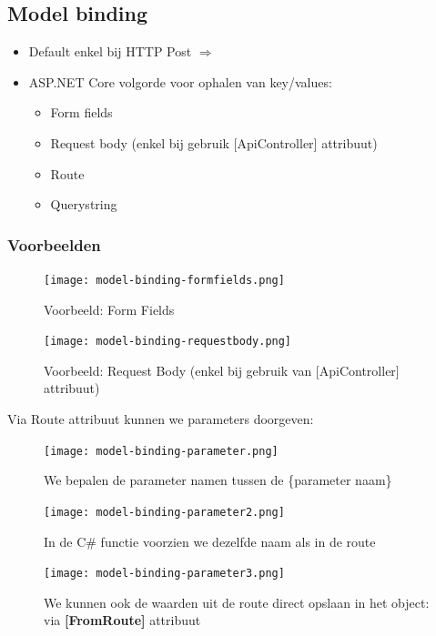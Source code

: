 \documentclass{article}
\begin{document}
\subsection{Model binding}

\begin{itemize}
    \item Default enkel bij HTTP Post $\Rightarrow$
    \item ASP.NET Core volgorde voor ophalen van key/values:
    \begin{itemize}
        \item Form fields
        \item Request body (enkel bij gebruik [ApiController] attribuut)
        \item Route
        \item Querystring
    \end{itemize}
\end{itemize}

\subsubsection{Voorbeelden}

\begin{figure}[H]
    \centering
    \texttt{[image: model-binding-formfields.png]}
    \caption{Voorbeeld: Form Fields}
\end{figure}

\begin{figure}[H]
    \centering
    \texttt{[image: model-binding-requestbody.png]}
    \caption{Voorbeeld: Request Body (enkel bij gebruik van [ApiController] attribuut)}
\end{figure}

Via Route attribuut kunnen we parameters doorgeven:

\begin{figure}[H]
    \centering
    \texttt{[image: model-binding-parameter.png]}
    \caption{We bepalen de parameter namen tussen de \{parameter naam\}}
\end{figure}

\begin{figure}[H]
    \centering
    \texttt{[image: model-binding-parameter2.png]}
    \caption{In de C\# functie voorzien we dezelfde naam als in de route}
\end{figure}

\begin{figure}[H]
    \centering
    \texttt{[image: model-binding-parameter3.png]}
    \caption{We kunnen ook de waarden uit de route direct opslaan in het object: via \textbf{[FromRoute]} attribuut}
\end{figure}
\end{document}
